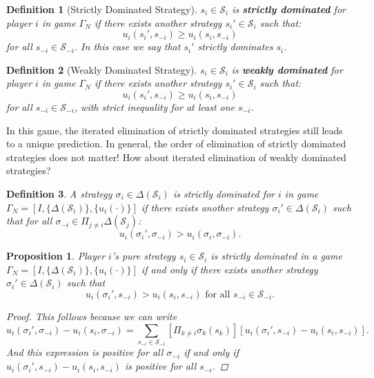\documentclass[12pt]{extreport} %
\theoremstyle{named}
\theoremstyle{itshape}
\newtheorem*{definition}{Definition}
\theoremstyle{normal}
\newtheorem{proposition}[unnamedtheorem]{Proposition}
\begin{document}
\begin{definition}[Strictly Dominated Strategy]
	$s_i \in \mathcal{S}_i$ is \textbf{strictly dominated} for player $i$ in game $\Gamma_N$ if there exists another strategy $s_i' \in \mathcal{S}_i$ such that:
	$$ u_i(s_i', s_{-i}) \geq u_i(s_i, s_{-i}) $$
	for all $s_{-i} \in \mathcal{S}_{-i}$. In this case we say that $s_i'$ strictly dominates $s_i$.
\end{definition}

\begin{definition}[Weakly Dominated Strategy]
	$s_i \in \mathcal{S}_{i}$ is \textbf{weakly dominated} for player $i$ in game $\Gamma_N$ if there exists another strategy $s_i' \in \mathcal{S}_i$ such that:
	$$ u_i(s_i', s_{-i}) \geq u_i(s_i, s_{-i}) $$
	for all $s_{-i} \in \mathcal{S}_{-i}$, with strict inequality for at least one $s_{-i}$.
\end{definition}

In this game, the iterated elimination of strictly dominated strategies still leads to a unique prediction. In general, the order of elimination of strictly dominated strategies does not matter! How about iterated elimination of weakly dominated strategies?

\begin{definition}
	A strategy $\sigma_i \in \Delta(\mathcal{S}_i)$ is strictly dominated for $i$ in game $\Gamma_{N} = [I, \{ \Delta(\mathcal{S}_i)\}, \{ u_i(\cdot) \}]$ if there exists another strategy $\sigma_i' \in \Delta(\mathcal{S}_i)$ such that for all $\sigma_{-i} \in \Pi_{j \neq i} \Delta(\mathcal{S}_{j})$:
	$$ u_{i}(\sigma_i', \sigma_{-i}) > u_i(\sigma_i, \sigma_{-i}). $$
\end{definition}


\begin{proposition}
	Player $i$'s pure strategy $s_i \in \mathcal{S}_i$ is strictly dominated in a game $\Gamma_N = [I, \{ \Delta(\mathcal{S}_i)\}, \{ u_i(\cdot)\}]$ if and only if there exists another strategy $\sigma_i' \in \Delta(\mathcal{S}_i)$ such that
	$$ u_i(\sigma_i', s_{-i}) > u_i(s_i, s_{-i}) \text{ for all } s_{-i} \in \mathcal{S}_{-i}. $$
	
	\begin{proof}
		This follows because we can write
		$$ u_i(\sigma_i', \sigma_{-i}) - u_i(s_i, \sigma_{-i}) = \sum_{s_{-i} \in \mathcal{S}_{-i}} \left[ \Pi_{k \neq i} \sigma_{k}(s_{k}) \right] \left[ u_{i}(\sigma_i', s_{-i}) - u_{i}(s_i, s_{-i}) \right]. $$
		And this expression is positive for all $\sigma_{-i}$ if and only if $u_i(\sigma_i', s_{-i}) - u_{i}(s_{i}, s_{-i})$ is positive for all $s_{-i}$.
	\end{proof}
\end{proposition}
\end{document}

